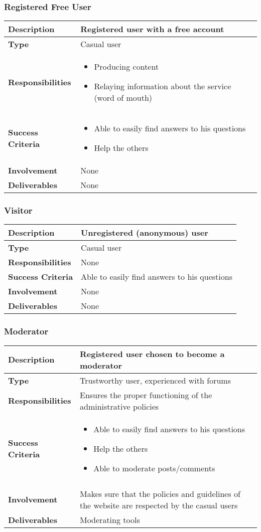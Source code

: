 \documentclass [a4paper, 11pt]{article}
\begin{document}
\subsubsection{Registered Free User}
\begin{tabular}{| >{\bfseries} M{85pt} | M{250pt} |}
	\hline
	Description & Registered user with a free account \tabularnewline
	\hline
	Type & Casual user \tabularnewline
	\hline
	Responsibilities &
	\begin{itemize}
		\item Producing content
		\item Relaying information about the service (word of mouth)
	\end{itemize} \tabularnewline
	\hline
	Success Criteria &
	\begin{itemize}
		\item Able to easily find answers to his questions
		\item Help the others
	\end{itemize} \tabularnewline
	\hline
	Involvement & None \tabularnewline
	\hline
	Deliverables & None \tabularnewline
	\hline
\end{tabular}

\subsubsection{Visitor}
\begin{tabular}{| >{\bfseries} M{85pt} | M{250pt} |}
	\hline
	Description & Unregistered (anonymous) user \tabularnewline
	\hline
	Type & Casual user \tabularnewline
	\hline
	Responsibilities & None \tabularnewline
	\hline
	Success Criteria & Able to easily find answers to his questions \tabularnewline
	\hline
	Involvement & None \tabularnewline
	\hline
	Deliverables & None \tabularnewline
	\hline
\end{tabular}

\subsubsection{Moderator}
\begin{tabular}{| >{\bfseries} M{85pt} | M{250pt} |}
	\hline
	Description & Registered user chosen to become a moderator \tabularnewline
	\hline
	Type & Trustworthy user, experienced with forums \tabularnewline
	\hline
	Responsibilities & Ensures the proper functioning of the administrative policies \tabularnewline
	\hline
	Success Criteria &
	\begin{itemize}
		\item Able to easily find answers to his questions
		\item Help the others
		\item Able to moderate posts/comments
	\end{itemize} \tabularnewline
 \tabularnewline
	\hline
	Involvement & Makes sure that the policies and guidelines of the website are respected by the casual users \tabularnewline
	\hline
	Deliverables & Moderating tools \tabularnewline
	\hline
\end{tabular}
\end{document}
